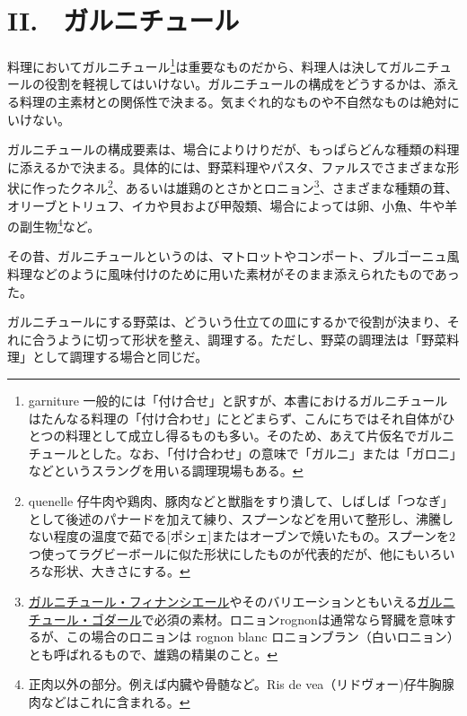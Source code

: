 \href{未、原文対照チェック}{} \href{未、日本語表現校正}{}
\href{未、その他修正}{} \href{未、原稿最終校正}{}

\begin{Main}

\hypertarget{garnitures}{%
\chapter{II.　ガルニチュール}\label{garnitures}}


 

料理においてガルニチュール\footnote{garniture
  一般的には「付け合せ」と訳すが、本書におけるガルニチュールはたんなる料理の「付け合わせ」にとどまらず、こんにちではそれ自体がひとつの料理として成立し得るものも多い。そのため、あえて片仮名でガルニチュールとした。なお、「付け合わせ」の意味で「ガルニ」または「ガロニ」などというスラングを用いる調理現場もある。}は重要なものだから、料理人は決してガルニチュールの役割を軽視してはいけない。ガルニチュールの構成をどうするかは、添える料理の主素材との関係性で決まる。気まぐれ的なものや不自然なものは絶対にいけない。

ガルニチュールの構成要素は、場合によりけりだが、もっぱらどんな種類の料理に添えるかで決まる。具体的には、野菜料理やパスタ、ファルスでさまざまな形状に作ったクネル\footnote{quenelle
  仔牛肉や鶏肉、豚肉などと獣脂をすり潰して、しばしば「つなぎ」として後述のパナードを加えて練り、スプーンなどを用いて整形し、沸騰しない程度の温度で茹でる{[}ポシェ{]}またはオーブンで焼いたもの。スプーンを2つ使ってラグビーボールに似た形状にしたものが代表的だが、他にもいろいろな形状、大きさにする。}、あるいは雄鶏のとさかとロニョン\footnote{\protect\hyperlink{garniture-a-la-financiere}{ガルニチュール・フィナンシエール}やそのバリエーションともいえる\protect\hyperlink{garniture-godard}{ガルニチュール・ゴダール}で必須の素材。ロニョンrognonは通常なら腎臓を意味するが、この場合のロニョンは
  rognon blanc
  ロニョンブラン（白いロニョン）とも呼ばれるもので、雄鶏の精巣のこと。}、さまざまな種類の茸、オリーブとトリュフ、イカや貝および甲殻類、場合によっては卵、小魚、牛や羊の副生物\footnote{正肉以外の部分。例えば内臓や骨髄など。Ris
  de vea（リドヴォー)仔牛胸腺肉などはこれに含まれる。}など。

その昔、ガルニチュールというのは、マトロットやコンポート、ブルゴーニュ風料理などのように風味付けのために用いた素材がそのまま添えられたものであった。

ガルニチュールにする野菜は、どういう仕立ての皿にするかで役割が決まり、それに合うように切って形状を整え、調理する。ただし、野菜の調理法は「野菜料理」として調理する場合と同じだ。


\end{Main}
